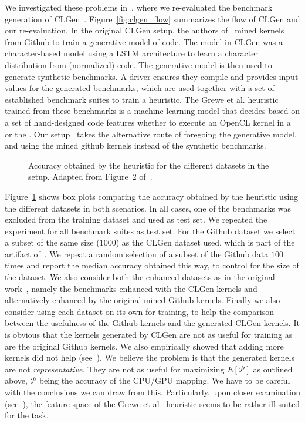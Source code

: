 We investigated these problems in~\cite{goens_mapl19}, where we re-evaluated the benchmark generation of CLGen~\cite{cummins_cgo17}.
Figure~\ref{fig:clgen_flow} summarizes the flow of CLGen and our re-evaluation.
In the original CLGen setup, the authors of~\cite{cumins_cgo17} mined kernels from Github to train a generative model of code.
The model in CLGen was a character-based model using a \ac{LSTM}\cite{lstm} architecture to learn a character distribution from (normalized) code.
The generative model is then used to generate synthetic benchmarks. A driver ensures they compile and provides input values for the generated benchmarks, which are used together with a set of established benchmark suites to train a heuristic.
The Grewe et al. heuristic~\cite{grewe_cgo2013} trained from these benchmarks is a machine learning model that decides based on a set of hand-designed code features whether to execute an OpenCL kernel in a  or the . 
Our setup~\cite{goens_mapl19} takes the alternative route of foregoing the generative model, and using the mined github kernels instead of the synthetic benchmarks.

\begin{figure}[h]
	\centering
\resizebox{0.95\textwidth}{!}{
     
     }
   \caption{Accuracy obtained by the heuristic for the different datasets in the setup. Adapted from Figure~2 of~\cite{goens_mapl19}.}
   \label{fig:clgen_accuracy}
\end{figure}

Figure~\ref{fig:clgen_accuracy} shows box plots comparing the accuracy obtained by the heuristic using the different datasets in both scenarios.
In all cases, one of the benchmarks was excluded from the training dataset and used as test set. We repeated the experiment for all benchmark suites as test set.
For the Github dataset we select a subset of the same size ($1000$) as the CLGen dataset used, which is part of the artifact of~\cite{cummins_cgo17}.
We repeat a random selection of a subset of the Github data $100$ times and report the median accuracy obtained this way, to control for the size of the dataset.
We also consider both the enhanced datasets as in the original work~\cite{cummins_cgo17}, namely the benchmarks enhanced with the CLGen kernels and alternatively enhanced by the original mined Github kernels.
Finally we also consider using each dataset on its own for training, to help the comparison between the usefulness of the Github kernels and the generated CLGen kernels. 
It is obvious that the kernels generated by CLGen are not as useful for training as are the original Github kernels.
We also empirically showed that adding more kernels did not help (see~\cite{goens_mapl19}).
We believe the problem is that the generated kernels are not \emph{representative}.
They are not as useful for maximizing $E[\mathcal{P}]$ as outlined above, $\mathcal{P}$ being the accuracy of the \ac{CPU}/\ac{GPU} mapping.
We have to be careful with the conclusions we can draw from this.
Particularly, upon closer examination (see~\cite{goens_mapl19}), the feature space of the Grewe et al~\cite{grewe_cgo2013} heuristic seems to be rather ill-suited for the task.

